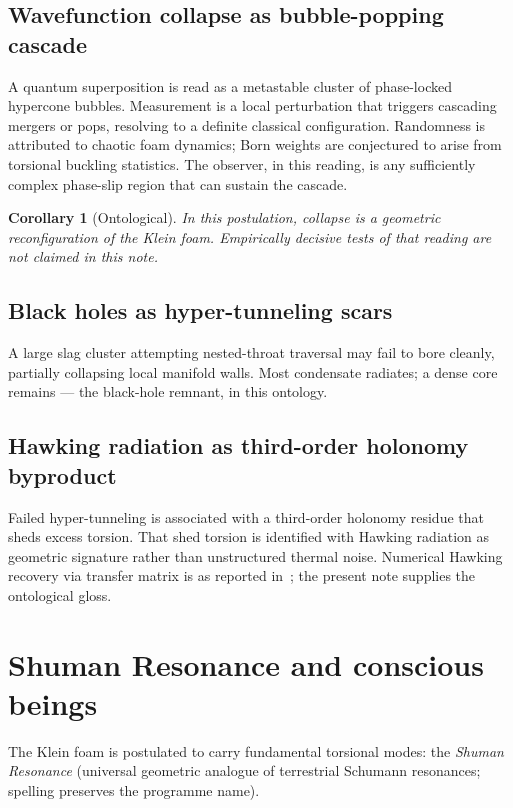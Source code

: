 \documentclass[11pt,a4paper]{article}
\newtheorem{corollary}{Corollary}[section]
\theoremstyle{definition}
\theoremstyle{remark}
\begin{document}
\subsection{Wavefunction collapse as bubble-popping cascade}

A quantum superposition is read as a metastable cluster of phase-locked
hypercone bubbles.  Measurement is a local perturbation that triggers
cascading mergers or pops, resolving to a definite classical
configuration.  Randomness is attributed to chaotic foam dynamics; Born
weights are conjectured to arise from torsional buckling statistics.
The observer, in this reading, is any sufficiently complex phase-slip
region that can sustain the cascade.

\begin{corollary}[Ontological]
In this postulation, collapse is a geometric reconfiguration of the
Klein foam.  Empirically decisive tests of that reading are not claimed
in this note.
\end{corollary}

\subsection{Black holes as hyper-tunneling scars}

A large slag cluster attempting nested-throat traversal may fail to bore
cleanly, partially collapsing local manifold walls.  Most condensate
radiates; a dense core remains --- the black-hole remnant, in this
ontology.

\subsection{Hawking radiation as third-order holonomy byproduct}

Failed hyper-tunneling is associated with a third-order holonomy residue
that sheds excess torsion.  That shed torsion is identified with Hawking
radiation as geometric signature rather than unstructured thermal noise.
Numerical Hawking recovery via transfer matrix is as reported
in~\cite{FlagDecay2026}; the present note supplies the ontological
gloss.

\section{Shuman Resonance and conscious beings}
\label{sec:shuman}

The Klein foam is postulated to carry fundamental torsional modes: the
\emph{Shuman Resonance} (universal geometric analogue of terrestrial
Schumann resonances; spelling preserves the programme name).
\end{document}
